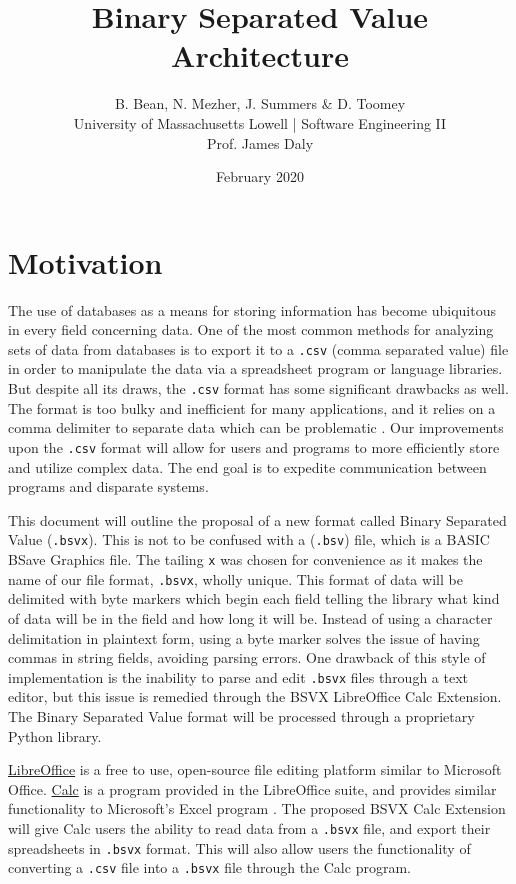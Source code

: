 \documentclass[10pt]{article}
\begin{document}
\title{Binary Separated Value\\Architecture}
\author{B. Bean, N. Mezher, J. Summers \& D. Toomey\\University of Massachusetts Lowell | Software Engineering II\\Prof. James Daly}
\date{February 2020}
\maketitle

\section*{Motivation}

The use of databases as a means for storing information has become ubiquitous in every field concerning data.
One of the most common methods for analyzing sets of data from databases is to export it to a \texttt{.csv} (comma separated value) file in order to manipulate the data via a spreadsheet program or language libraries.
But despite all its draws, the \texttt{.csv} format has some significant drawbacks as well.
The format is too bulky and inefficient for many applications, and it relies on a comma delimiter to separate data which can be problematic \cite{Coleman2011}.
Our improvements upon the \texttt{.csv} format will allow for users and programs to more efficiently store and utilize complex data.
The end goal is to expedite communication between programs and disparate systems.

\indent{}
This document will outline the proposal of a new format called Binary Separated Value (\texttt{.bsvx}).
This is not to be confused with a  (\texttt{.bsv}) file, which is a BASIC BSave Graphics file.
The tailing \texttt{x} was chosen for convenience as it makes the name of our file format, \texttt{.bsvx},  wholly unique.
This format of data will be delimited with byte markers which begin each field telling the library what kind of data will be in the field and how long it will be.
Instead of using a character delimitation in plaintext form, using a byte marker solves the issue of having commas in string fields, avoiding parsing errors.
One drawback of this style of implementation is the inability to parse and edit \texttt{.bsvx} files through a text editor, but this issue is remedied through the BSVX LibreOffice Calc Extension.
The Binary Separated Value format will be processed through a proprietary Python library.

\indent{}
\href{https://www.libreoffice.org/discover/libreoffice/}{LibreOffice} is a free to use, open-source file editing platform similar to Microsoft Office.
\href{https://www.libreoffice.org/discover/calc/}{Calc} is a program provided in the LibreOffice suite, and provides similar functionality to Microsoft’s Excel program \cite{Guthrie2012}.
The proposed BSVX Calc Extension will give Calc users the ability to read data from a \texttt{.bsvx} file, and export their spreadsheets in \texttt{.bsvx} format.
This will also allow users the functionality of converting a \texttt{.csv} file into a \texttt{.bsvx} file through the Calc program.
\end{document}

